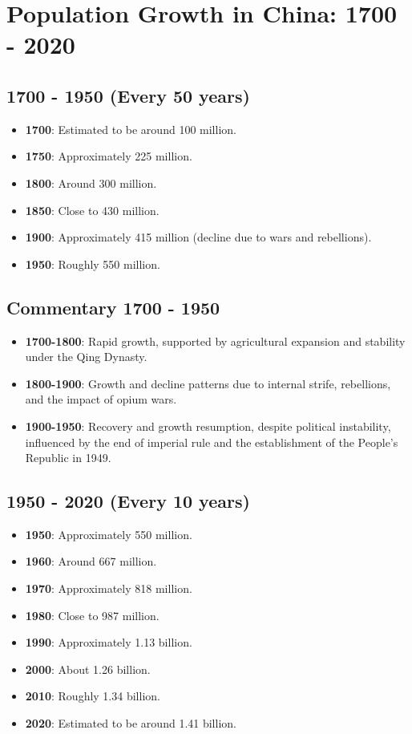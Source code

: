 \section{Population Growth in China: 1700 - 2020}

\subsection*{1700 - 1950 (Every 50 years)}
\begin{itemize}
    \item \textbf{1700}: Estimated to be around 100 million.
    \item \textbf{1750}: Approximately 225 million.
    \item \textbf{1800}: Around 300 million.
    \item \textbf{1850}: Close to 430 million.
    \item \textbf{1900}: Approximately 415 million (decline due to wars and rebellions).
    \item \textbf{1950}: Roughly 550 million.
\end{itemize}

\subsection*{Commentary 1700 - 1950}
\begin{itemize}
    \item \textbf{1700-1800}: Rapid growth, supported by agricultural expansion and stability under the Qing Dynasty.
    \item \textbf{1800-1900}: Growth and decline patterns due to internal strife, rebellions, and the impact of opium wars.
    \item \textbf{1900-1950}: Recovery and growth resumption, despite political instability, influenced by the end of imperial rule and the establishment of the People’s Republic in 1949.
\end{itemize}

\subsection*{1950 - 2020 (Every 10 years)}
\begin{itemize}
    \item \textbf{1950}: Approximately 550 million.
    \item \textbf{1960}: Around 667 million.
    \item \textbf{1970}: Approximately 818 million.
    \item \textbf{1980}: Close to 987 million.
    \item \textbf{1990}: Approximately 1.13 billion.
    \item \textbf{2000}: About 1.26 billion.
    \item \textbf{2010}: Roughly 1.34 billion.
    \item \textbf{2020}: Estimated to be around 1.41 billion.
\end{itemize}


